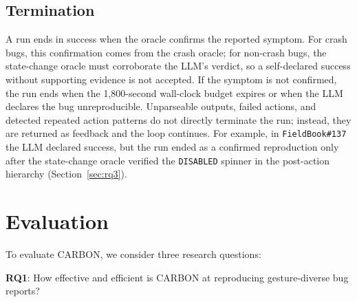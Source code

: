 \documentclass[10pt,conference,a4paper]{IEEEtran}
\begin{document}
  \subsection{Termination}
  \label{sec:approach:termination}

  A run ends in success when the oracle confirms the reported symptom. For crash bugs, this confirmation comes from the crash oracle; for non-crash bugs, the state-change oracle must corroborate the LLM's verdict, so a self-declared success without supporting evidence is not accepted. If the symptom is not confirmed, the run ends when the 1{,}800-second wall-clock budget expires or when the LLM declares the bug unreproducible. Unparseable outputs, failed actions, and detected repeated action patterns do not directly terminate the run; instead, they are returned as feedback and the loop continues. For example, in \texttt{FieldBook\#137} the LLM declared success, but the run ended as a confirmed reproduction only after the state-change oracle verified the \texttt{DISABLED} spinner in the post-action hierarchy (Section~\ref{sec:rq3}).

  \section{Evaluation}
  \label{sec:empirical}
  
  To evaluate CARBON, we consider three research questions:
  
\textbf{RQ1}: How effective and efficient is CARBON at reproducing gesture-diverse
  bug reports?
  
\end{document}
